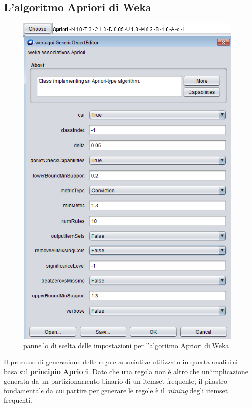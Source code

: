    \subsection{L'algoritmo Apriori di Weka}
    \label{apriori}

    \begin{figure}
        \centering
        \caption{pannello di scelta delle impostazioni per l'algoritmo Apriori di Weka}
        \label{apriori_weka}
	    \includegraphics[scale=1.0]{img/apriori_weka.png}
    \end{figure}

        Il processo di generazione delle regole associative utilizzato in questa analisi si basa sul \textbf{principio Apriori}. Dato che una regola non è altro che un'implicazione generata da un partizionamento binario di un itemset frequente, il pilastro fondamentale da cui partire per generare le regole è il \textit{mining} degli itemset frequenti. \\

